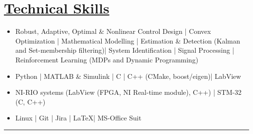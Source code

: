 \section*{\underline{Technical Skills}}
\begin{itemize}
        \item[\itbf{Control and Estimation:}] Robust, Adaptive, Optimal \& Nonlinear Control Design |
        Convex Optimization | Mathematical Modelling |
        Estimation \& Detection (Kalman and Set-membership filtering)|
        System Identification | Signal Processing |
        Reinforcement Learning (MDPs and Dynamic Programming)
        \item[\itbf{Programming:}] Python | MATLAB \& Simulink | C | C++ (CMake, boost/eigen)| LabView
        \item[\itbf{Embedded Systems:}] NI-RIO systems (LabView (FPGA, NI Real-time module), C++) | STM-32 (C, C++)
        \item[\itbf{OS \& Tools:}] Linux | Git | Jira | \LaTeX | MS-Office Suit
\end{itemize}
\noindent\rule{\textwidth}{0.4pt}
